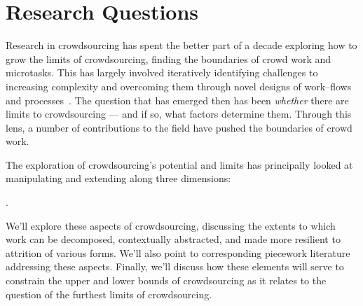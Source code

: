 \documentclass[trackingWork]{subfiles}
\begin{document}
\section{Research Questions}

{Research in crowdsourcing has spent the better part of a decade
exploring how to grow the limits of crowdsourcing,
finding the boundaries of crowd work and microtasks.}
This has largely involved iteratively
  identifying challenges to increasing complexity and
  overcoming them through novel designs of work--flows and processes~\cite[e.g.][]{bernsteinSoylent,foundry,crowdForgeKittur}.
The question that has emerged then
has been \textit{whether} there are limits to crowdsourcing
--- and if so, what factors determine them.
Through this lens,
a number of contributions to the field have pushed the boundaries of crowd work.

The exploration of crowdsourcing's potential and limits has principally looked at
manipulating and extending along three dimensions:
\begin{Numberlist}[itemjoin*={.~And~},itemjoin={.~}]
  \item {}
  \item {}
  \item {}.
\end{Numberlist}
We'll explore these aspects of crowdsourcing,  discussing the extents to which work can be
decomposed,  contextually abstracted, and
made more resilient to attrition of various forms.
We'll also point to corresponding piecework literature addressing these aspects.
Finally, we'll discuss how these elements will serve
to constrain the upper and lower bounds of crowdsourcing as it relates
to the question of the furthest limits of crowdsourcing.






\end{document}
